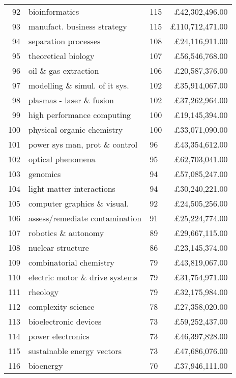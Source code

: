 \begin{spacing}{0.9}
\begin{longtable}[c]{r|>{\raggedleft\arraybackslash}m{6.5cm}|>{\raggedleft\arraybackslash}m{1.9cm}|r}
{92} & {bioinformatics} & {115} & {\pounds42,302,496.00}\\
{93} & {manufact. business strategy} & {115} & {\pounds110,712,471.00}\\
{94} & {separation processes} & {108} & {\pounds24,116,911.00}\\
{95} & {theoretical biology} & {107} & {\pounds56,546,768.00}\\
{96} & {oil \& gas extraction} & {106} & {\pounds20,587,376.00}\\
{97} & {modelling \& simul. of it sys.} & {102} & {\pounds35,914,067.00}\\
{98} & {plasmas - laser \& fusion} & {102} & {\pounds37,262,964.00}\\
{99} & {high performance computing} & {100} & {\pounds19,145,394.00}\\
{100} & {physical organic chemistry} & {100} & {\pounds33,071,090.00}\\
{101} & {power sys man, prot \& control} & {96} & {\pounds43,354,612.00}\\
{102} & {optical phenomena} & {95} & {\pounds62,703,041.00}\\
{103} & {genomics} & {94} & {\pounds57,085,247.00}\\
{104} & {light-matter interactions} & {94} & {\pounds30,240,221.00}\\
{105} & {computer graphics \& visual.} & {92} & {\pounds24,505,256.00}\\
{106} & {assess/remediate contamination} & {91} & {\pounds25,224,774.00}\\
{107} & {robotics \& autonomy} & {89} & {\pounds29,667,115.00}\\
{108} & {nuclear structure} & {86} & {\pounds23,145,374.00}\\
{109} & {combinatorial chemistry} & {79} & {\pounds43,819,067.00}\\
{110} & {electric motor \& drive systems} & {79} & {\pounds31,754,971.00}\\
{111} & {rheology} & {79} & {\pounds32,175,984.00}\\
{112} & {complexity science} & {78} & {\pounds27,358,020.00}\\
{113} & {bioelectronic devices} & {73} & {\pounds59,252,437.00}\\
{114} & {power electronics} & {73} & {\pounds46,397,828.00}\\
{115} & {sustainable energy vectors} & {73} & {\pounds47,686,076.00}\\
{116} & {bioenergy} & {70} & {\pounds37,946,111.00}\\

\end{longtable}
\end{spacing}
